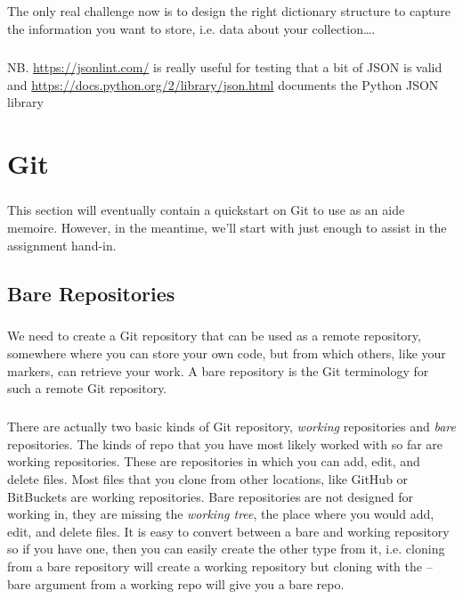 \documentclass[12pt, a4paper, oneside]{book}
\begin{document}
\paragraph{} The only real challenge now is to design the right dictionary structure to capture the information you want to store, i.e. data about your collection….

\paragraph{} NB.   \url{https://jsonlint.com/} is really useful for testing that a bit of JSON is valid and \url{https://docs.python.org/2/library/json.html} documents the Python JSON library



\chapter{Git}
\label{git}

\paragraph{} This section will eventually contain a quickstart on Git to use as an aide memoire. However, in the meantime, we'll start with just enough to assist in the assignment hand-in.


\section{Bare Repositories}
\paragraph{} We need to create a Git repository that can be used as a remote repository, somewhere where you can store your own code, but from which others, like your markers, can retrieve your work. A bare repository is the Git terminology for such a remote Git repository. 

\paragraph{} There are actually two basic kinds of Git repository, \emph{working} repositories and \emph{bare} repositories. The kinds of repo that you have most likely worked with so far are working repositories. These are repositories in which you can add, edit, and delete files. Most files that you clone from other locations, like GitHub or BitBuckets are working repositories. Bare repositories are not designed for working in, they are missing the \emph{working tree}, the place where you would add, edit, and delete files. It is easy to convert between a bare and working repository so if you have one, then you can easily create the other type from it, i.e. cloning from a bare repository will create a working repository but cloning with the --bare argument from a working repo will give you a bare repo.
\end{document}
